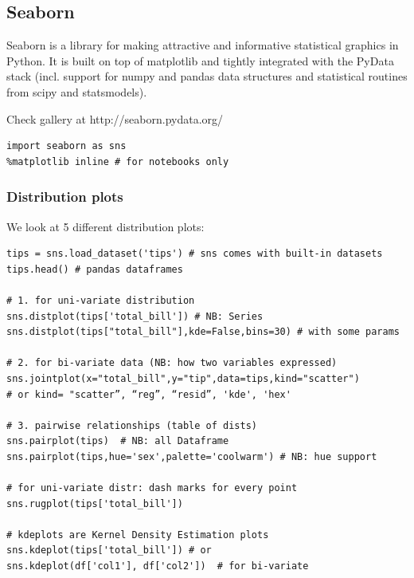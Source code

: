 \documentclass[11pt]{article}
\begin{document}
\subsection{Seaborn}
Seaborn is a library for making attractive and informative statistical graphics in Python. It is built on top of matplotlib and tightly integrated with the PyData stack (incl. support for numpy and pandas data structures and statistical routines from scipy and statsmodels).

Check gallery at http://seaborn.pydata.org/
\begin{lstlisting}
import seaborn as sns
%matplotlib inline # for notebooks only
\end{lstlisting}


\subsubsection{Distribution plots}
We look at 5 different distribution plots:
\begin{lstlisting}
tips = sns.load_dataset('tips') # sns comes with built-in datasets
tips.head() # pandas dataframes

# 1. for uni-variate distribution
sns.distplot(tips['total_bill']) # NB: Series
sns.distplot(tips["total_bill"],kde=False,bins=30) # with some params

# 2. for bi-variate data (NB: how two variables expressed)
sns.jointplot(x="total_bill",y="tip",data=tips,kind="scatter")
# or kind= "scatter”, “reg”, “resid”, 'kde', 'hex'

# 3. pairwise relationships (table of dists)
sns.pairplot(tips)  # NB: all Dataframe
sns.pairplot(tips,hue='sex',palette='coolwarm') # NB: hue support

# for uni-variate distr: dash marks for every point 
sns.rugplot(tips['total_bill'])

# kdeplots are Kernel Density Estimation plots
sns.kdeplot(tips['total_bill']) # or
sns.kdeplot(df['col1'], df['col2'])  # for bi-variate
\end{lstlisting}

\end{document}
